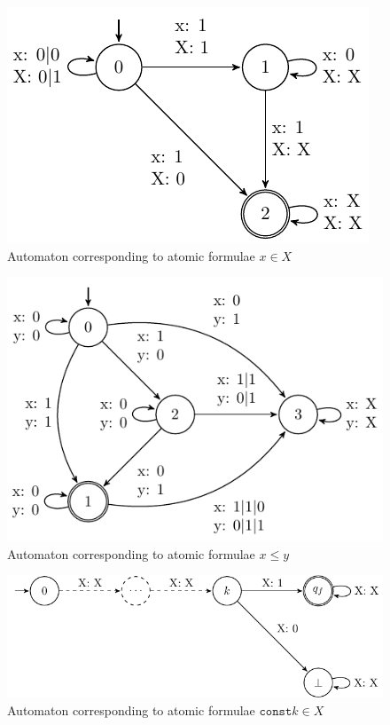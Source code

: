 \begin{figure}[h!]
 \begin{center}
  \includegraphics{fig/atomic-x-in-X}
 \end{center}
 \caption{Automaton corresponding to atomic formulae $x \in X$}
\end{figure}

\begin{figure}[h!]
 \begin{center}
  \includegraphics{fig/atomic-x-lesseq-y}
 \end{center}
 \caption{Automaton corresponding to atomic formulae $x \leq y$}
\end{figure}

\begin{figure}[h!]
 \begin{center}
  \includegraphics{fig/atomic-konst-in-X}
 \end{center}
 \caption{Automaton corresponding to atomic formulae $\mathtt{const} k \in X$}
\end{figure}

